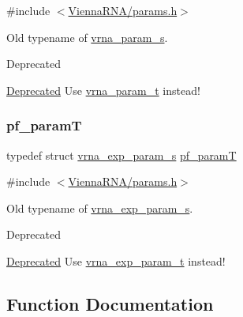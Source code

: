 {\ttfamily \#include $<$\hyperlink{params_8h}{Vienna\+R\+N\+A/params.\+h}$>$}



Old typename of \hyperlink{group__energy__parameters_structvrna__param__s}{vrna\+\_\+param\+\_\+s}. 

\begin{DoxyRefDesc}{Deprecated}
\item[\hyperlink{deprecated__deprecated000090}{Deprecated}]Use \hyperlink{group__energy__parameters_ga8a69ca7d787e4fd6079914f5343a1f35}{vrna\+\_\+param\+\_\+t} instead! \end{DoxyRefDesc}
\mbox{\label{group__energy__parameters_ga8bffe1828e2cbec101769f5cc0b1535b}} 
\subsubsection{\texorpdfstring{pf\+\_\+paramT}{pf\_paramT}}
{\footnotesize\ttfamily typedef struct \hyperlink{group__energy__parameters_structvrna__exp__param__s}{vrna\+\_\+exp\+\_\+param\+\_\+s} \hyperlink{group__energy__parameters_ga8bffe1828e2cbec101769f5cc0b1535b}{pf\+\_\+paramT}}



{\ttfamily \#include $<$\hyperlink{params_8h}{Vienna\+R\+N\+A/params.\+h}$>$}



Old typename of \hyperlink{group__energy__parameters_structvrna__exp__param__s}{vrna\+\_\+exp\+\_\+param\+\_\+s}. 

\begin{DoxyRefDesc}{Deprecated}
\item[\hyperlink{deprecated__deprecated000091}{Deprecated}]Use \hyperlink{group__energy__parameters_ga01d8b92fe734df8d79a6169482c7d8d8}{vrna\+\_\+exp\+\_\+param\+\_\+t} instead! \end{DoxyRefDesc}


\subsection{Function Documentation}
\mbox{\label{group__energy__parameters_gad0e3e7e74bdc50d1709d40c92993185e}} 

